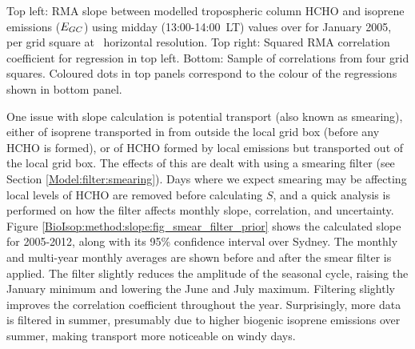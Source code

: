     { %
      Top left: RMA slope between modelled tropospheric column HCHO and isoprene emissions ($E_{GC}$) using midday (13:00-14:00~LT) values over for January 2005, per grid square at \lowhr ~horizontal resolution.
      Top right: Squared RMA correlation coefficient for regression in top left. 
      Bottom: Sample of correlations from four grid squares.
      Coloured dots in top panels correspond to the colour of the regressions shown in bottom panel.
    }
    {\label{BioIsop:method:slope:fig_regressions}}
    
    
    One issue with slope calculation is potential transport (also known as smearing), either of isoprene transported in from outside the local grid box (before any HCHO is formed), or of HCHO formed by local emissions but transported out of the local grid box.
    The effects of this are dealt with using a smearing filter (see Section \ref{Model:filter:smearing}).
    Days where we expect smearing may be affecting local levels of HCHO are removed before calculating $S$, and a quick analysis is performed on how the filter affects monthly slope, correlation, and uncertainty.
    Figure \ref{BioIsop:method:slope:fig_smear_filter_prior} shows the calculated slope for 2005-2012, along with its 95\% confidence interval over Sydney.
    The monthly and multi-year monthly averages are shown before and after the smear filter is applied.
    The filter slightly reduces the amplitude of the seasonal cycle, raising the January minimum and lowering the June and July maximum.
    Filtering slightly improves the correlation coefficient throughout the year.
    Surprisingly, more data is filtered in summer, presumably due to higher biogenic isoprene emissions over summer, making transport more noticeable on windy days.
